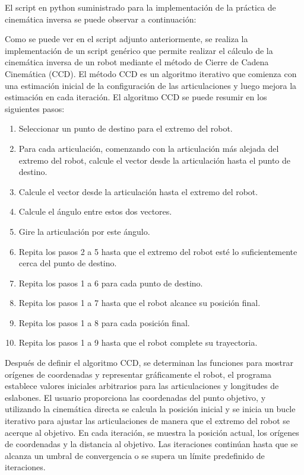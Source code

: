 \documentclass[11pt]{report}
\begin{document}
El script en python suministrado para la implementación de la práctica de cinemática inversa se puede observar a continuación:



Como se puede ver en el script adjunto anteriormente, se realiza la implementación de un script genérico que permite realizar el cálculo de la cinemática inversa de un robot mediante el método de Cierre de Cadena Cinemática (CCD). El método CCD es un algoritmo iterativo que comienza con una estimación inicial de la configuración de las articulaciones y luego mejora la estimación en cada iteración. El algoritmo CCD se puede resumir en los siguientes pasos:

\begin{enumerate}
    \item Seleccionar un punto de destino para el extremo del robot.
    \item Para cada articulación, comenzando con la articulación más alejada del extremo del robot, calcule el vector desde la articulación hasta el punto de destino.
    \item Calcule el vector desde la articulación hasta el extremo del robot.
    \item Calcule el ángulo entre estos dos vectores.
    \item Gire la articulación por este ángulo.
    \item Repita los pasos 2 a 5 hasta que el extremo del robot esté lo suficientemente cerca del punto de destino.
    \item Repita los pasos 1 a 6 para cada punto de destino.
    \item Repita los pasos 1 a 7 hasta que el robot alcance su posición final.
    \item Repita los pasos 1 a 8 para cada posición final.
    \item Repita los pasos 1 a 9 hasta que el robot complete su trayectoria.
\end{enumerate}

Después de definir el algoritmo CCD, se determinan las funciones para mostrar orígenes de coordenadas y representar gráficamente el robot, el programa establece valores iniciales arbitrarios para las articulaciones y longitudes de eslabones. El usuario proporciona las coordenadas del punto objetivo, y utilizando la cinemática directa se calcula la posición inicial y se inicia un bucle iterativo para ajustar las articulaciones de manera que el extremo del robot se acerque al objetivo. En cada iteración, se muestra la posición actual, los orígenes de coordenadas y la distancia al objetivo. Las iteraciones continúan hasta que se alcanza un umbral de convergencia o se supera un límite predefinido de iteraciones.
\end{document}
